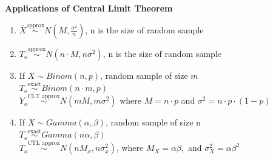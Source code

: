 \documentclass[11pt,oneside]{book}
\theoremstyle{break}
\theoremstyle{break}
\begin{document}
\textbf{Applications of Central Limit Theorem}\begin{enumerate}
\item $\bar{X}\overset{\text{approx}}{\sim} N\left(M,\frac{\sigma^2}{n} \right)$, n is the size of random sample
\item $T_o\overset{\text{approx}}{\sim} N(n\cdot M,n\sigma^2)$, n is the size of random sample
\item If $X\sim Binom (n,p)$, random sample of size $m$\\
$T_o \overset{\text{exact}}{\sim}Binom(n\cdot m,p)$\\
$Y_o \overset{\text{CLT approx}}{\sim} N(mM, m\sigma^2)$ where $M=n\cdot p$ and $\sigma^2=n\cdot p \cdot(1-p)$
\item If $X\sim Gamma(\alpha,\beta)$, random sample of size n\\
$T_o \overset{\text{exact}}{\sim} Gamma(n\alpha, \beta)$ \\
$T_o \overset{\text{CTL approx}}{\sim} N(nM_x,n\sigma_x^2)$, where $M_X=\alpha \beta,$ and $\sigma_X^2=\alpha \beta^2$
\end{enumerate}
\end{document}
